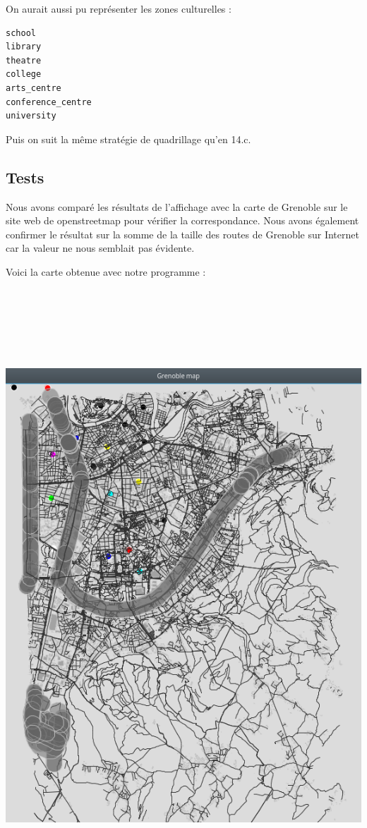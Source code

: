 \documentclass[12pt,a4paper]{article}
\begin{document}
On aurait aussi pu représenter les zones culturelles :

\begin{lstlisting}
school
library
theatre
college
arts_centre
conference_centre
university
\end{lstlisting}

Puis on suit la même stratégie de quadrillage qu'en 14.c.

\subsection*{Tests}

Nous avons comparé les résultats de l'affichage avec la carte de Grenoble sur le site web de openstreetmap pour vérifier la correspondance. Nous avons également confirmer le résultat sur la somme de la taille des routes de Grenoble sur Internet car la valeur ne nous semblait pas évidente.

\newpage
Voici la carte obtenue avec notre programme :

\includegraphics[height=23cm]{map.png}
\end{document}

